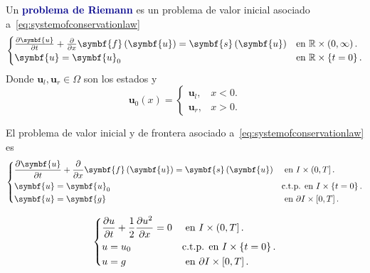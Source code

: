 \begin{definition}
	Un \textcolor{DarkBlue}{\bfseries problema de Riemann}
	 es un problema de valor inicial
	asociado a~\eqref{eq:systemofconservationlaw}
	\begin{equation}\label{eq:cauchysystemofconservationlaw}
		\begin{cases}
			\diffp{\symbf{u}}{t}+
			\diffp{}{x}
			\symbf{f}\left(\symbf{u}\right)=
			\symbf{s}\left(\symbf{u}\right) &
			\text{en }\mathbb{R}\times\left(0,\infty\right). \\
			\symbf{u}=\symbf{u}_{0}         &
			\text{en }\mathbb{R}\times\left\{t=0\right\}.
		\end{cases}
	\end{equation}
	Donde $\symbf{u}_{l},\symbf{u}_{r}\in\Omega$ son los estados y
	\begin{equation*}
		\symbf{u}_{0}\left(x\right)=
		\begin{cases}
			\symbf{u}_{l}, & x<0. \\
			\symbf{u}_{r}, & x>0.
		\end{cases}
	\end{equation*}
\end{definition}

\begin{definition}
	El problema de valor inicial y de frontera asociado
	a~\eqref{eq:systemofconservationlaw} es
	\begin{equation}
		\begin{dcases}
			\diffp{\symbf{u}}{t}+
			\diffp{}{x}\symbf{f}\left(\symbf{u}\right)=
			\symbf{s}\left(\symbf{u}\right) &
			\text{ en }I\times\left(0,T\right].         \\
			\symbf{u}=\symbf{u}_{0}         &
			\text{c.t.p. en }I\times\left\{t=0\right\}. \\
			\symbf{u}=\symbf{g}             &
			\text{ en }\partial I\times\left[0,T\right].
		\end{dcases}
	\end{equation}
\end{definition}

\begin{example}
	\begin{equation}
		\begin{dcases}
			\diffp{u}{t}+
			\frac{1}{2}\diffp{u^{2}}{x}=0 &
			\text{ en }I\times\left(0,T\right].         \\
			u=u_{0}                       &
			\text{c.t.p. en }I\times\left\{t=0\right\}. \\
			u=g                           &
			\text{ en }\partial I\times\left[0,T\right].
		\end{dcases}
	\end{equation}
\end{example}

